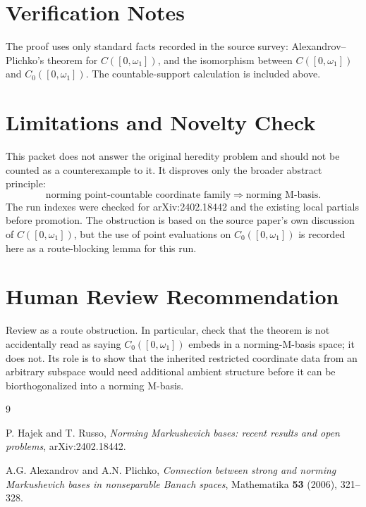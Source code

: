 \documentclass[11pt]{article}
\begin{document}
\section*{Verification Notes}

The proof uses only standard facts recorded in the source survey:
Alexandrov--Plichko's theorem for \(C([0,\omega_1])\), and the isomorphism
between \(C([0,\omega_1])\) and \(C_0([0,\omega_1])\). The countable-support
calculation is included above.

\section*{Limitations and Novelty Check}

This packet does not answer the original heredity problem and should not be
counted as a counterexample to it. It disproves only the broader abstract
principle:
\[
\text{norming point-countable coordinate family}
  \Longrightarrow
\text{norming M-basis}.
\]
The run indexes were checked for arXiv:2402.18442 and the existing local
partials before promotion. The obstruction is based on the source paper's own
discussion of \(C([0,\omega_1])\), but the use of point evaluations on
\(C_0([0,\omega_1])\) is recorded here as a route-blocking lemma for this run.

\section*{Human Review Recommendation}

Review as a route obstruction. In particular, check that the theorem is not
accidentally read as saying \(C_0([0,\omega_1])\) embeds in a norming-M-basis
space; it does not. Its role is to show that the inherited restricted
coordinate data from an arbitrary subspace would need additional ambient
structure before it can be biorthogonalized into a norming M-basis.

\begin{thebibliography}{9}

P. Hajek and T. Russo,
\emph{Norming Markushevich bases: recent results and open problems},
arXiv:2402.18442.

A.G. Alexandrov and A.N. Plichko,
\emph{Connection between strong and norming Markushevich bases in
nonseparable Banach spaces},
Mathematika \textbf{53} (2006), 321--328.

\end{thebibliography}
\end{document}
